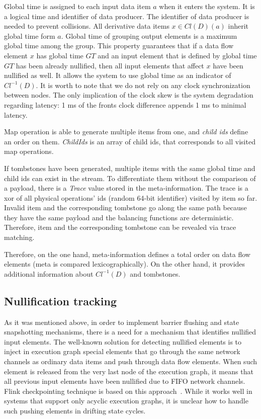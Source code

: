 Global time is assigned to each input data item $a$ when it enters the system. It is a logical time and identifier of data producer. The identifier of data producer is needed to prevent collisions. All derivative data items $x \in Cl(D)(a)$ inherit global time form $a$. Global time of grouping output elements is a maximum global time among the group. This property guarantees that if a data flow element $x$ has global time $GT$ and an input element that is defined by global time $GT$ has been already nullified, then all input elements that affect $x$ have been nullified as well. It allows the system to use global time as an indicator of $Cl^{-1}(D)$. It is worth to note that we do not rely on any clock synchronization between nodes. The only implication of the clock skew is the system degradation regarding latency: 1 ms of the fronts clock difference appends 1 ms to minimal latency.

Map operation is able to generate multiple items from one, and {\em child ids} define an order on them. {\it ChildIds} is an array of child ids, that corresponds to all visited map operations.

If tombstones have been generated, multiple items with the same global time and child ids can exist in the stream. To differentiate them without the comparison of a payload, there is a {\it Trace} value stored in the meta-information. The trace is a xor of all physical operations' ids (random 64-bit identifier) visited by item so far. Invalid item and the corresponding tombstone go along the same path because they have the same payload and the balancing functions are deterministic. Therefore, item and the corresponding tombstone can be revealed via trace matching. 

Therefore, on the one hand, meta-information defines a total order on data flow elements (meta is compared lexicographically). On the other hand, it provides additional information about $Cl^{-1}(D)$ and tombstones.

\subsection{Nullification tracking}


As it was mentioned above, in order to implement barrier flushing and state snapshotting mechanisms, there is a need for a mechanism that identifies nullified input elements. The well-known solution for detecting nullified elements is to inject in execution graph special elements that go through the same network channels as ordinary data items and push through data flow elements. When such element is released from the very last node of the execution graph, it means that all previous input elements have been nullified due to FIFO network channels. Flink checkpointing technique is based on this approach~\cite{Carbone:2017:SMA:3137765.3137777}. While it works well in systems that support only acyclic execution graphs, it is unclear how to handle such pushing elements in drifting state cycles. 

